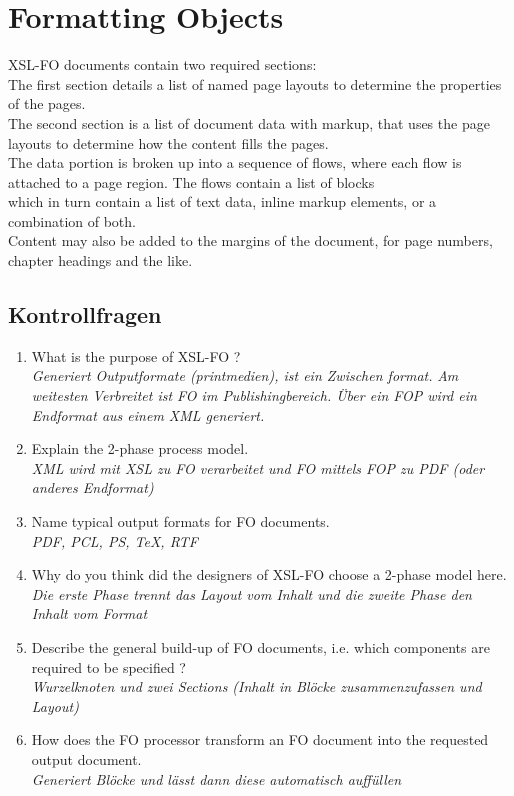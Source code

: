\chapter{Formatting Objects}
XSL-FO documents contain two required sections:\\
The first section details a list of named page layouts to determine the properties of the pages.\\
The second section is a list of document data with markup, that uses the page layouts to determine how the content fills the pages.\\
The data portion is broken up into a sequence of flows, where each flow is attached to a page region. The flows contain a list of blocks\\
which in turn contain a list of text data, inline markup elements, or a combination of both.\\
Content may also be added to the margins of the document, for page numbers, chapter headings and the like.\\



\section{Kontrollfragen}
\begin{enumerate}
\item What is the purpose of XSL-FO ?\\
\textit{Generiert Outputformate (printmedien), ist ein Zwischen format.}
\textit{Am weitesten Verbreitet ist FO im Publishingbereich. Über ein FOP wird ein Endformat aus einem XML generiert.
}


\item Explain the 2-phase process model.\\
\textit{XML wird mit XSL zu FO verarbeitet und FO mittels FOP zu PDF (oder anderes Endformat)}

\item Name typical output formats for FO documents.\\
\textit{PDF, PCL, PS, TeX, RTF}

\item Why do you think did the designers of XSL-FO choose a 2-phase model here.\\
\textit{Die erste Phase trennt das Layout vom Inhalt und die zweite Phase den Inhalt vom Format}


\item Describe the general build-up of FO documents, i.e. which components are required to be specified ?\\
\textit{Wurzelknoten und zwei Sections (Inhalt in Blöcke zusammenzufassen und Layout)}

\item How does the FO processor transform an FO document into the requested output document.\\
\textit{Generiert Blöcke und lässt dann diese automatisch auffüllen}

\end{enumerate}
